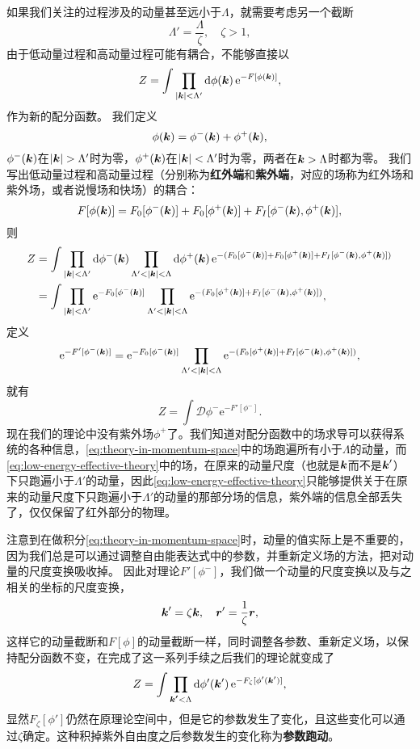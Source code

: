 \documentclass[hyperref, UTF8, a4paper]{ctexart}
\newcommand*{\ee}{\mathrm{e}}
\newcommand*{\fd}[1]{\mathcal{D}{#1}}
\begin{document}
如果我们关注的过程涉及的动量甚至远小于$\Lambda$，就需要考虑另一个截断
\[
    \Lambda' = \frac{\Lambda}{\zeta}, \quad \zeta > 1,
\]
由于低动量过程和高动量过程可能有耦合，不能够直接以
\[
    Z = \int \prod_{\abs{\vb*{k}} < \Lambda' } \dd{\phi(\vb*{k})} \ee^{ - F[\phi(\vb*{k})]},
\]
作为新的配分函数。
我们定义
\[
    \phi(\vb*{k}) = \phi^-(\vb*{k}) + \phi^+(\vb*{k}),
\]
$\phi^-(\vb*{k})$在$\abs{\vb*{k}} > \Lambda'$时为零，$\phi^+(\vb*{k})$在$\abs{\vb*{k}} < \Lambda'$时为零，两者在$\vb*{k} > \Lambda$时都为零。
我们写出低动量过程和高动量过程（分别称为\textbf{红外端}和\textbf{紫外端}，对应的场称为红外场和紫外场，或者说慢场和快场）的耦合：
\[
    F[\phi(\vb*{k})] = F_0 [\phi^-(\vb*{k})] + F_0 [\phi^+(\vb*{k})] + F_I [\phi^-(\vb*{k}) , \phi^+ (\vb*{k})],
\]
则
\[
    \begin{aligned}
        Z &= \int \prod_{\abs{\vb*{k}} < \Lambda'} \dd{\phi^{-}(\vb*{k})} \prod_{\Lambda' < \abs{\vb*{k}} < \Lambda} \dd{\phi^+ (\vb*{k})} \ee^{- (F_0 [\phi^-(\vb*{k})] + F_0 [\phi^+(\vb*{k})] + F_I [\phi^-(\vb*{k}) , \phi^+ (\vb*{k})])} \\
        &= \int \prod_{\abs{\vb*{k}} < \Lambda'} \ee^{- F_0 [\phi^-(\vb*{k})]} \prod_{\Lambda' < \abs{\vb*{k}} < \Lambda} \ee^{- (F_0 [\phi^+(\vb*{k})] + F_I [\phi^-(\vb*{k}) , \phi^+ (\vb*{k})])},
    \end{aligned}
\]
定义
\[
    \ee^{-F'[\phi^-(\vb*{k})]} = \ee^{- F_0 [\phi^-(\vb*{k})]} \prod_{\Lambda' < \abs{\vb*{k}} < \Lambda} \ee^{- (F_0 [\phi^+(\vb*{k})] + F_I [\phi^-(\vb*{k}) , \phi^+ (\vb*{k})])},
\]
就有
\begin{equation}
    Z = \int \fd{\phi^-} \ee^{-F'[\phi^-]}.
    \label{eq:low-energy-effective-theory}
\end{equation}
现在我们的理论中没有紫外场$\phi^+$了。我们知道对配分函数中的场求导可以获得系统的各种信息，\eqref{eq:theory-in-momentum-space}中的场跑遍所有小于$\Lambda$的动量，而\eqref{eq:low-energy-effective-theory}中的场，在原来的动量尺度（也就是$\vb*{k}$而不是$\vb*{k}'$）下只跑遍小于$\Lambda'$的动量，因此\eqref{eq:low-energy-effective-theory}只能够提供关于在原来的动量尺度下只跑遍小于$\Lambda'$的动量的那部分场的信息，紫外端的信息全部丢失了，仅仅保留了红外部分的物理。

注意到在做积分\eqref{eq:theory-in-momentum-space}时，动量的值实际上是不重要的，因为我们总是可以通过调整自由能表达式中的参数，并重新定义场的方法，把对动量的尺度变换吸收掉。
因此对理论$F'[\phi^-]$，我们做一个动量的尺度变换以及与之相关的坐标的尺度变换，
\[
    \vb*{k}' = \zeta \vb*{k}, \quad \vb*{r}' = \frac{1}{\zeta} \vb*{r},
\]
这样它的动量截断和$F[\phi]$的动量截断一样，同时调整各参数、重新定义场，以保持配分函数不变，在完成了这一系列手续之后我们的理论就变成了
\[
    Z = \int \prod_{\vb*{k'} < \Lambda} \dd{\phi'(\vb*{k}')} \ee^{-F_\zeta [\phi'(\vb*{k}')]},
\]
显然$F_\zeta[\phi']$仍然在原理论空间中，但是它的参数发生了变化，且这些变化可以通过$\zeta$确定。这种积掉紫外自由度之后参数发生的变化称为\textbf{参数跑动}。
\end{document}
